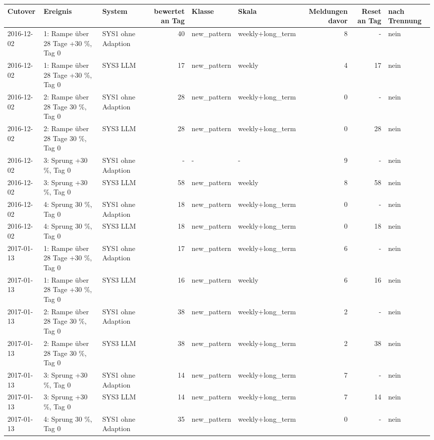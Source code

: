 \begin{tabular}{lllrllrrl}
\toprule
Cutover & Ereignis & System & bewertet an Tag & Klasse & Skala & Meldungen davor & Reset an Tag & nach Trennung \\
\midrule
2016-12-02 & 1: Rampe über 28 Tage +30 \%, Tag 0 & SYS1 ohne Adaption & 40 & new\_pattern & weekly+long\_term & 8 & - & nein \\
2016-12-02 & 1: Rampe über 28 Tage +30 \%, Tag 0 & SYS3 LLM & 17 & new\_pattern & weekly & 4 & 17 & nein \\
2016-12-02 & 2: Rampe über 28 Tage \textminus{}30 \%, Tag 0 & SYS1 ohne Adaption & 28 & new\_pattern & weekly+long\_term & 0 & - & nein \\
2016-12-02 & 2: Rampe über 28 Tage \textminus{}30 \%, Tag 0 & SYS3 LLM & 28 & new\_pattern & weekly+long\_term & 0 & 28 & nein \\
2016-12-02 & 3: Sprung +30 \%, Tag 0 & SYS1 ohne Adaption & - & - & - & 9 & - & nein \\
2016-12-02 & 3: Sprung +30 \%, Tag 0 & SYS3 LLM & 58 & new\_pattern & weekly & 8 & 58 & nein \\
2016-12-02 & 4: Sprung \textminus{}30 \%, Tag 0 & SYS1 ohne Adaption & 18 & new\_pattern & weekly+long\_term & 0 & - & nein \\
2016-12-02 & 4: Sprung \textminus{}30 \%, Tag 0 & SYS3 LLM & 18 & new\_pattern & weekly+long\_term & 0 & 18 & nein \\
2017-01-13 & 1: Rampe über 28 Tage +30 \%, Tag 0 & SYS1 ohne Adaption & 17 & new\_pattern & weekly+long\_term & 6 & - & nein \\
2017-01-13 & 1: Rampe über 28 Tage +30 \%, Tag 0 & SYS3 LLM & 16 & new\_pattern & weekly & 6 & 16 & nein \\
2017-01-13 & 2: Rampe über 28 Tage \textminus{}30 \%, Tag 0 & SYS1 ohne Adaption & 38 & new\_pattern & weekly+long\_term & 2 & - & nein \\
2017-01-13 & 2: Rampe über 28 Tage \textminus{}30 \%, Tag 0 & SYS3 LLM & 38 & new\_pattern & weekly+long\_term & 2 & 38 & nein \\
2017-01-13 & 3: Sprung +30 \%, Tag 0 & SYS1 ohne Adaption & 14 & new\_pattern & weekly+long\_term & 7 & - & nein \\
2017-01-13 & 3: Sprung +30 \%, Tag 0 & SYS3 LLM & 14 & new\_pattern & weekly+long\_term & 7 & 14 & nein \\
2017-01-13 & 4: Sprung \textminus{}30 \%, Tag 0 & SYS1 ohne Adaption & 35 & new\_pattern & weekly+long\_term & 0 & - & nein \\

\end{tabular}
